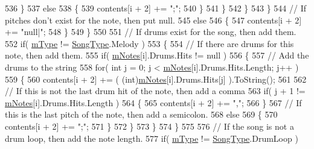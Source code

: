 \begin{DoxyCode}
536                             \}
537                             \textcolor{keywordflow}{else}
538                             \{
539                                 contents[i + 2] += \textcolor{stringliteral}{";"};
540                             \}
541                         \}
542                     \}
543                 \}
544                 \textcolor{comment}{// If pitches don't exist for the note, then put null.}
545                 \textcolor{keywordflow}{else}
546                 \{
547                     contents[i + 2] += \textcolor{stringliteral}{"null|"};
548                 \}
549             \}
550 
551             \textcolor{comment}{// If drums exist for the song, then add them.}
552             \textcolor{keywordflow}{if}( \hyperlink{group___song_priv_var_gaf3b9d0f461522324f897b746311b43c5}{mType} != \hyperlink{group___song_enums_gae681a1f001333e39fc1cb4fea97bfe1b}{SongType}.Melody )
553             \{
554                 \textcolor{comment}{// If there are drums for this note, then add them. }
555                 \textcolor{keywordflow}{if}( \hyperlink{group___song_priv_var_ga674bc904a1f856d485d5fb7fe84bac85}{mNotes}[i].Drums.Hits != null )
556                 \{
557                     \textcolor{comment}{// Add the drums to the string}
558                     \textcolor{keywordflow}{for}( \textcolor{keywordtype}{int} j = 0; j < \hyperlink{group___song_priv_var_ga674bc904a1f856d485d5fb7fe84bac85}{mNotes}[i].Drums.Hits.Length; j++ )
559                     \{
560                         contents[i + 2] += ( (int)\hyperlink{group___song_priv_var_ga674bc904a1f856d485d5fb7fe84bac85}{mNotes}[i].Drums.Hits[j] ).ToString();
561 
562                         \textcolor{comment}{// If this is not the last drum hit of the note, then add a comma}
563                         \textcolor{keywordflow}{if}( j + 1 != \hyperlink{group___song_priv_var_ga674bc904a1f856d485d5fb7fe84bac85}{mNotes}[i].Drums.Hits.Length )
564                         \{
565                             contents[i + 2] += \textcolor{stringliteral}{","};
566                         \}
567                         \textcolor{comment}{// If this is the last pitch of the note, then add a semicolon.}
568                         \textcolor{keywordflow}{else}
569                         \{
570                             contents[i + 2] += \textcolor{stringliteral}{";"};
571                         \}
572                     \}
573                 \}
574             \}
575 
576             \textcolor{comment}{// If the song is not a drum loop, then add the note length.}
577             \textcolor{keywordflow}{if}( \hyperlink{group___song_priv_var_gaf3b9d0f461522324f897b746311b43c5}{mType} != \hyperlink{group___song_enums_gae681a1f001333e39fc1cb4fea97bfe1b}{SongType}.DrumLoop )

\end{DoxyCode}
